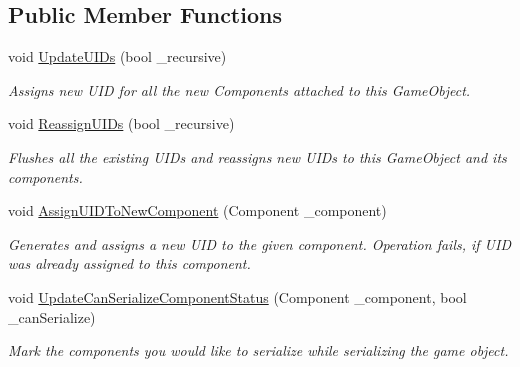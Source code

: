 \subsection*{Public Member Functions}
\begin{DoxyCompactItemize}
\item 
void \hyperlink{class_voxel_busters_1_1_runtime_serialization_1_1_u_i_d_system_a75c6c5969a529560977d81b057045591}{Update\+U\+I\+Ds} (bool \+\_\+recursive)
\begin{DoxyCompactList}\small\item\em Assigns new U\+I\+D for all the new Components attached to this Game\+Object. \end{DoxyCompactList}\item 
void \hyperlink{class_voxel_busters_1_1_runtime_serialization_1_1_u_i_d_system_a08bb2b4305e52d8aed36cc6e596321b9}{Reassign\+U\+I\+Ds} (bool \+\_\+recursive)
\begin{DoxyCompactList}\small\item\em Flushes all the existing U\+I\+D\textquotesingle{}s and reassigns new U\+I\+D\textquotesingle{}s to this Game\+Object and its components. \end{DoxyCompactList}\item 
void \hyperlink{class_voxel_busters_1_1_runtime_serialization_1_1_u_i_d_system_a005f830bafab7110730d5401c9191816}{Assign\+U\+I\+D\+To\+New\+Component} (Component \+\_\+component)
\begin{DoxyCompactList}\small\item\em Generates and assigns a new U\+I\+D to the given component. Operation fails, if U\+I\+D was already assigned to this component. \end{DoxyCompactList}\item 
void \hyperlink{class_voxel_busters_1_1_runtime_serialization_1_1_u_i_d_system_ad3e2318987bafe5ca509ca2585bbcb14}{Update\+Can\+Serialize\+Component\+Status} (Component \+\_\+component, bool \+\_\+can\+Serialize)
\begin{DoxyCompactList}\small\item\em Mark the components you would like to serialize while serializing the game object. \end{DoxyCompactList}\end{DoxyCompactItemize}


